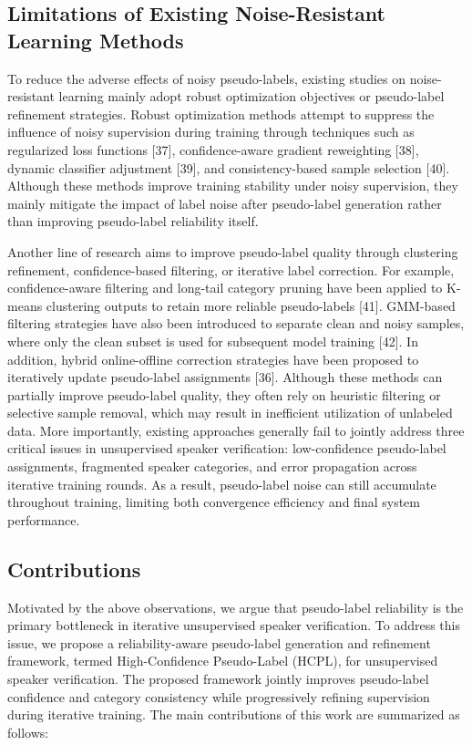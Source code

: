 \documentclass[lettersize,journal]{IEEEtran}
\begin{document}
\subsection{Limitations of Existing Noise-Resistant Learning Methods}

To reduce the adverse effects of noisy pseudo-labels, existing studies on noise-resistant learning mainly adopt robust optimization objectives or pseudo-label refinement strategies. Robust optimization methods attempt to suppress the influence of noisy supervision during training through techniques such as regularized loss functions [37], confidence-aware gradient reweighting [38], dynamic classifier adjustment [39], and consistency-based sample selection [40]. Although these methods improve training stability under noisy supervision, they mainly mitigate the impact of label noise after pseudo-label generation rather than improving pseudo-label reliability itself.

Another line of research aims to improve pseudo-label quality through clustering refinement, confidence-based filtering, or iterative label correction. For example, confidence-aware filtering and long-tail category pruning have been applied to K-means clustering outputs to retain more reliable pseudo-labels [41]. GMM-based filtering strategies have also been introduced to separate clean and noisy samples, where only the clean subset is used for subsequent model training [42]. In addition, hybrid online-offline correction strategies have been proposed to iteratively update pseudo-label assignments [36]. Although these methods can partially improve pseudo-label quality, they often rely on heuristic filtering or selective sample removal, which may result in inefficient utilization of unlabeled data. More importantly, existing approaches generally fail to jointly address three critical issues in unsupervised speaker verification: low-confidence pseudo-label assignments, fragmented speaker categories, and error propagation across iterative training rounds. As a result, pseudo-label noise can still accumulate throughout training, limiting both convergence efficiency and final system performance.

\subsection{Contributions}

Motivated by the above observations, we argue that pseudo-label reliability is the primary bottleneck in iterative unsupervised speaker verification. To address this issue, we propose a reliability-aware pseudo-label generation and refinement framework, termed High-Confidence Pseudo-Label (HCPL), for unsupervised speaker verification. The proposed framework jointly improves pseudo-label confidence and category consistency while progressively refining supervision during iterative training. The main contributions of this work are summarized as follows:
\end{document}
